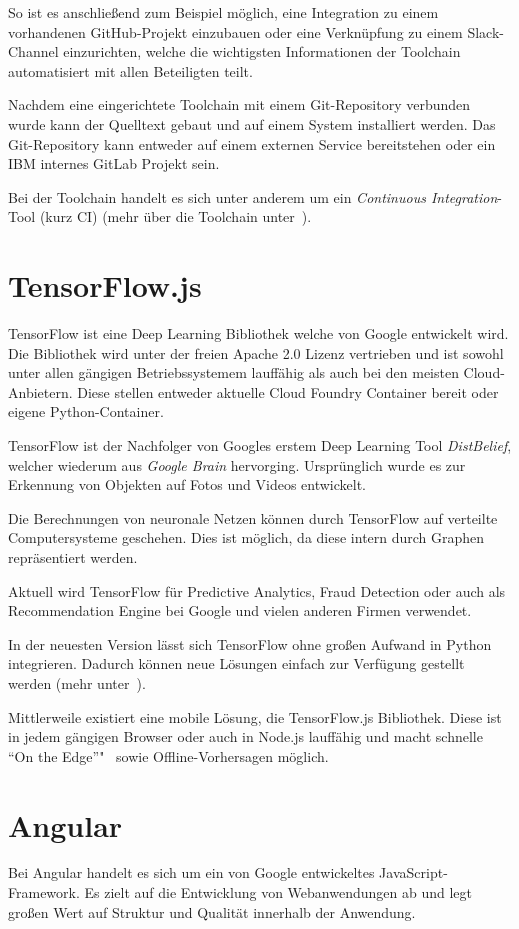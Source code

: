 So ist es anschließend zum Beispiel möglich, eine Integration zu einem vorhandenen GitHub-Projekt einzubauen oder eine
Verknüpfung zu einem Slack-Channel einzurichten, welche die wichtigsten Informationen der Toolchain automatisiert
mit allen Beteiligten teilt.

Nachdem eine eingerichtete Toolchain mit einem Git-Repository verbunden wurde kann der Quelltext gebaut und auf einem
System installiert werden. Das Git-Repository kann entweder auf einem externen Service bereitstehen oder ein IBM
internes GitLab Projekt sein.

Bei der Toolchain handelt es sich unter anderem um ein \textit{Continuous Integration}-Tool (kurz CI)
(mehr über die Toolchain unter~\cite{online_grundlagen_toolchain}).

\section{TensorFlow.js}
TensorFlow ist eine Deep Learning Bibliothek welche von Google entwickelt wird. Die Bibliothek wird unter der freien
Apache 2.0 Lizenz vertrieben und ist sowohl unter allen gängigen Betriebssystemem lauffähig als auch bei den meisten
Cloud-Anbietern. Diese stellen entweder aktuelle Cloud Foundry Container bereit oder eigene Python-Container.

TensorFlow ist der Nachfolger von Googles erstem Deep Learning Tool \textit{DistBelief}, welcher wiederum aus
\textit{Google Brain} hervorging. Ursprünglich wurde es zur Erkennung von Objekten auf Fotos und Videos entwickelt.

Die Berechnungen von neuronale Netzen können durch TensorFlow auf verteilte Computersysteme geschehen. Dies ist möglich,
da diese intern durch Graphen repräsentiert werden.

Aktuell wird TensorFlow für Predictive Analytics, Fraud Detection oder auch als Recommendation Engine bei Google und
vielen anderen Firmen verwendet.

In der neuesten Version lässt sich TensorFlow ohne großen Aufwand in Python integrieren. Dadurch können neue Lösungen
einfach zur Verfügung gestellt werden (mehr unter~\cite{book_grundlagen_tensorflow}).

Mittlerweile existiert eine mobile Lösung, die TensorFlow.js Bibliothek. Diese ist in jedem gängigen Browser oder auch
in Node.js lauffähig und macht schnelle \enquote{On the Edge}"~ sowie Offline-Vorhersagen möglich.

\section{Angular}
Bei Angular handelt es sich um ein von Google entwickeltes JavaScript-Framework. Es zielt auf die Entwicklung von
Webanwendungen ab und legt großen Wert auf Struktur und Qualität innerhalb der Anwendung.

